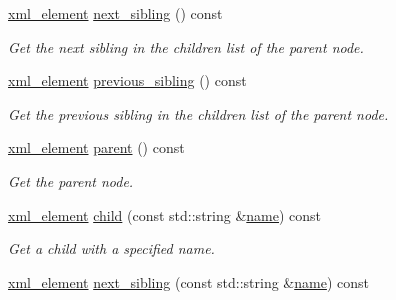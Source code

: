 \begin{DoxyCompactItemize}
\hyperlink{classlsl_1_1xml__element}{xml\+\_\+element} \hyperlink{classlsl_1_1xml__element_a9637215f616b660789696e452b0e0591}{next\+\_\+sibling} () const
\begin{DoxyCompactList}\small\item\em Get the next sibling in the children list of the parent node. \end{DoxyCompactList}\item 
\mbox{\label{classlsl_1_1xml__element_a78c2e0b3d7bda2b5a2d478e3c0cdc87a}} 
\hyperlink{classlsl_1_1xml__element}{xml\+\_\+element} \hyperlink{classlsl_1_1xml__element_a78c2e0b3d7bda2b5a2d478e3c0cdc87a}{previous\+\_\+sibling} () const
\begin{DoxyCompactList}\small\item\em Get the previous sibling in the children list of the parent node. \end{DoxyCompactList}\item 
\mbox{\label{classlsl_1_1xml__element_ae3211be3c10164f366220b638a9dd200}} 
\hyperlink{classlsl_1_1xml__element}{xml\+\_\+element} \hyperlink{classlsl_1_1xml__element_ae3211be3c10164f366220b638a9dd200}{parent} () const
\begin{DoxyCompactList}\small\item\em Get the parent node. \end{DoxyCompactList}\item 
\mbox{\label{classlsl_1_1xml__element_a111ef129dce406af43948d8c9b915148}} 
\hyperlink{classlsl_1_1xml__element}{xml\+\_\+element} \hyperlink{classlsl_1_1xml__element_a111ef129dce406af43948d8c9b915148}{child} (const std\+::string \&\hyperlink{classlsl_1_1xml__element_a2e449e85b7e763b1d0db4bb19d2eb7c2}{name}) const
\begin{DoxyCompactList}\small\item\em Get a child with a specified name. \end{DoxyCompactList}\item 
\mbox{\label{classlsl_1_1xml__element_a100590d2a9822261a3f0b0ed7810134d}} 
\hyperlink{classlsl_1_1xml__element}{xml\+\_\+element} \hyperlink{classlsl_1_1xml__element_a100590d2a9822261a3f0b0ed7810134d}{next\+\_\+sibling} (const std\+::string \&\hyperlink{classlsl_1_1xml__element_a2e449e85b7e763b1d0db4bb19d2eb7c2}{name}) const

\end{DoxyCompactItemize}
